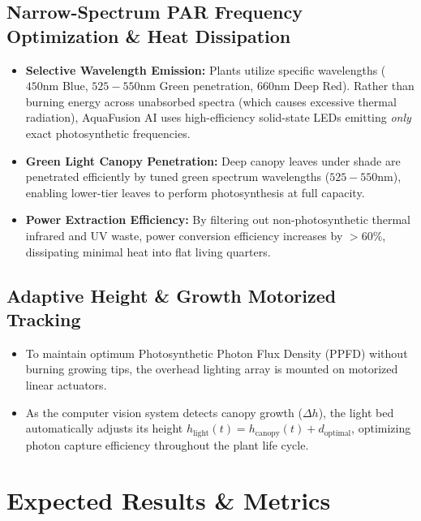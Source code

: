 \documentclass[12pt,a4paper]{article}
\begin{document}
\subsection{Narrow-Spectrum PAR Frequency Optimization \& Heat Dissipation}
\begin{itemize}
    \item \textbf{Selective Wavelength Emission:} Plants utilize specific wavelengths ($450\text{nm}$ Blue, $525-550\text{nm}$ Green penetration, $660\text{nm}$ Deep Red). Rather than burning energy across unabsorbed spectra (which causes excessive thermal radiation), AquaFusion AI uses high-efficiency solid-state LEDs emitting \emph{only} exact photosynthetic frequencies.
    \item \textbf{Green Light Canopy Penetration:} Deep canopy leaves under shade are penetrated efficiently by tuned green spectrum wavelengths ($525-550\text{nm}$), enabling lower-tier leaves to perform photosynthesis at full capacity.
    \item \textbf{Power Extraction Efficiency:} By filtering out non-photosynthetic thermal infrared and UV waste, power conversion efficiency increases by $>60\%$, dissipating minimal heat into flat living quarters.
\end{itemize}

\subsection{Adaptive Height \& Growth Motorized Tracking}
\begin{itemize}
    \item To maintain optimum Photosynthetic Photon Flux Density (PPFD) without burning growing tips, the overhead lighting array is mounted on motorized linear actuators.
    \item As the computer vision system detects canopy growth ($\Delta h$), the light bed automatically adjusts its height $h_{\text{light}}(t) = h_{\text{canopy}}(t) + d_{\text{optimal}}$, optimizing photon capture efficiency throughout the plant life cycle.
\end{itemize}

\section{Expected Results \& Metrics}
\end{document}
